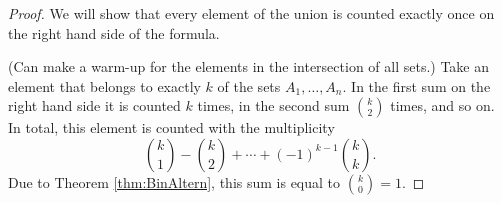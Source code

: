 \begin{proof}
We will show that every element of the union is counted exactly once on the right hand side of the formula.

(Can make a warm-up for the elements in the intersection of all sets.)
Take an element that belongs to exactly $k$ of the sets $A_1, \ldots, A_n$.
In the first sum on the right hand side it is counted $k$ times,
in the second sum $\binom{k}{2}$ times, and so on.
In total, this element is counted with the multiplicity
\[
\binom{k}{1} - \binom{k}{2} + \cdots + (-1)^{k-1}\binom{k}{k}.
\]
Due to Theorem \ref{thm:BinAltern}, this sum is equal to $\binom{k}{0} = 1$.
\end{proof}
